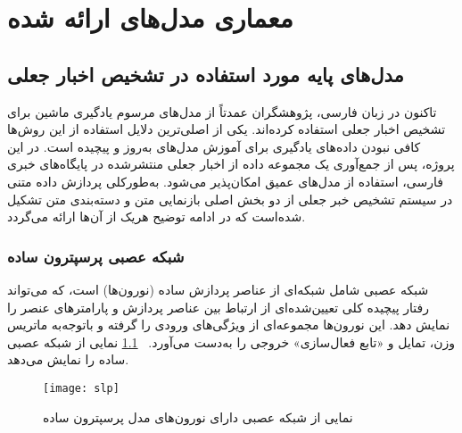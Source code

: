 \chapter{معماری مدل‌های ارائه شده}
\section{مدل‌های پایه مورد استفاده در تشخیص اخبار جعلی}
تاکنون در زبان فارسی، پژوهشگران عمدتاً از مدل‌های مرسوم یادگیری ماشین برای تشخیص اخبار جعلی استفاده کرده‌اند. یکی از اصلی‌ترین دلایل استفاده از این روش‌ها کافی نبودن داده‌های یادگیری برای آموزش مدل‌های به‌روز و پیچیده است. در این پروژه، پس از جمع‌آوری یک مجموعه داده از اخبار جعلی منتشرشده در پایگاه‌های خبری فارسی، استفاده از مدل‌های عمیق امکان‌پذیر می‌شود. به‌طورکلی پردازش داده متنی در سیستم تشخیص خبر جعلی‌ از دو بخش اصلی بازنمایی متن و دسته‌بندی متن تشکیل شده‌است که در ادامه توضیح هریک از آن‌ها ارائه می‌گردد.
\subsection{شبکه عصبی پرسپترون ساده}
شبکه عصبی شامل شبکه‌ای از عناصر پردازش ساده (نورون‌ها) است، که می‌تواند رفتار پیچیده کلی تعیین‌شده‌ای از ارتباط بین عناصر پردازش و پارامترهای عنصر را نمایش دهد. این نورون‌ها مجموعه‌ای از ویژگی‌های ورودی را گرفته و باتوجه‌به ماتریس وزن، تمایل و «تابع فعال‌سازی» خروجی را به‌دست می‌آورد. \figurename~\ref{fig.slp} نمایی از شبکه عصبی ساده را نمایش می‌دهد.
\begin{figure}[!h]
\texttt{[image: slp]}
\centering
\caption{نمایی از شبکه عصبی دارای نورون‌های مدل پرسپترون ساده}
\label{fig.slp}
\end{figure}

